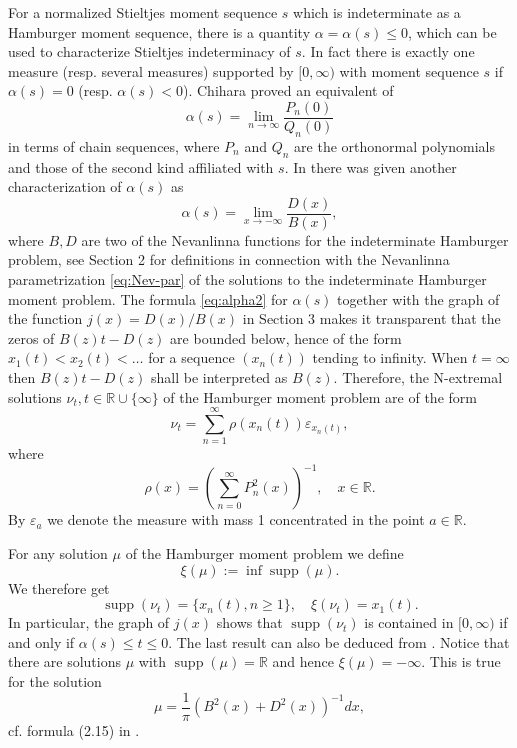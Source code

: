 \documentclass[12pt]{article}
\DeclareMathOperator{\supp}{supp}
\newcommand{\R}{\mathbb{R}}
\def\R{\mathbb{R}}
\begin{document}
For a normalized Stieltjes moment sequence $s$ which is indeterminate as a Hamburger moment sequence, there is a  quantity $\alpha=\alpha(s)\le 0$, which  
can be used to characterize Stieltjes indeterminacy of $s$. In fact there is exactly one measure (resp. several measures) supported by $[0,\infty)$  with moment sequence $s$ if  $\alpha(s)=0$ (resp. $\alpha(s)<0$). Chihara \cite[Lemma 1]{Ch1} proved an equivalent of
\begin{equation}\label{eq:alpha1}
\alpha(s)=\lim_{n\to\infty}\frac{P_n(0)}{Q_n(0)}
\end{equation}
in terms of chain sequences,
where $P_n$ and $Q_n$ are the orthonormal polynomials and those of the second kind affiliated with $s$. In \cite{B:V} there was given another characterization of $\alpha(s)$ as
\begin{equation}\label{eq:alpha2}
\alpha(s)=\lim_{x\to -\infty}\frac{D(x)}{B(x)},
\end{equation}
where $B,D$ are two of the Nevanlinna functions for the indeterminate Hamburger problem,
see Section 2  for definitions in connection with the Nevanlinna parametrization \eqref{eq:Nev-par} of the solutions to the indeterminate Hamburger moment problem. The formula \eqref{eq:alpha2} for $\alpha(s)$ together with the graph of the function $j(x)=D(x)/B(x)$ in Section 3 makes it transparent that the zeros of $B(z)t-D(z)$ are bounded below, hence of the form $x_1(t)<x_2(t)<\ldots$ for a sequence $(x_n(t))$ tending to infinity. When $t=\infty$ then $B(z)t-D(z)$ shall be interpreted as $B(z)$. Therefore, the
 N-extremal solutions $\nu_t, t\in\R\cup\{\infty\}$ of the Hamburger moment problem are of the form
\begin{equation}\label{eq:Ne1}
\nu_t=\sum_{n=1}^\infty \rho(x_n(t))\varepsilon_{x_n(t)},
\end{equation}
where 
\begin{equation}\label{eq:Ne2}
\rho(x)=\left(\sum_{n=0}^\infty P_n^2(x)\right)^{-1},\quad x\in\R.
\end{equation}
By $\varepsilon_a$ we denote the measure with mass 1 concentrated in the point $a\in\R$.

For any solution $\mu$ of the Hamburger moment problem we define
\begin{equation}\label{eq:Ne3}
\xi(\mu):=\inf \supp(\mu).
\end{equation}
We therefore get
$$
\supp(\nu_t)=\{x_n(t), n\ge 1\},\quad \xi(\nu_t)=x_1(t).
$$
In particular, the graph of $j(x)$  shows that $\supp(\nu_t)$ is contained in $[0,\infty)$ if and only if $\alpha(s)\le t\le 0$. The last  result can also be deduced from \cite[p. 340]{Ch2}. Notice that there are solutions $\mu$ with $\supp(\mu)=\R$ and hence $\xi(\mu)=-\infty$. This is true for the solution 
$$
\mu=\frac{1}{\pi}\left(B^2(x)+D^2(x)\right)^{-1}dx,
$$
cf. formula (2.15) in \cite{B:V}.
\end{document}
